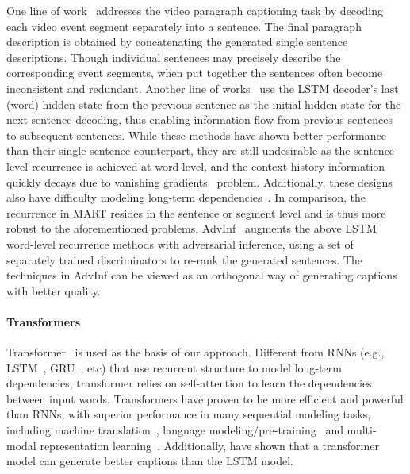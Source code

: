 \documentclass[11pt,a4paper]{article}
\begin{document}
One line of work~\cite{zhou2018end, Zhou2018GroundedVD} addresses the video paragraph captioning task by decoding each video event segment separately into a sentence. 
The final paragraph description is obtained by concatenating the generated single sentence descriptions. Though individual sentences may precisely describe the corresponding event segments, when put together the sentences often become inconsistent and redundant.
Another line of works~\cite{Xiong2018MoveFA, gella2018dataset} use the LSTM decoder's last (word) hidden state from the previous sentence as the initial hidden state for the next sentence decoding, thus enabling information flow from previous sentences to subsequent sentences.
While these methods have shown better performance than their single sentence counterpart, they are still undesirable as the sentence-level recurrence is achieved at word-level, and the context history information quickly decays due to vanishing gradients~\cite{pascanu2013difficulty} problem.
Additionally, these designs also have difficulty modeling long-term dependencies~\cite{hochreiter2001gradient}. 
In comparison, the recurrence in MART resides in the sentence or segment level and is thus more robust to the aforementioned problems. 
AdvInf~\cite{park2019adversarial} augments the above LSTM word-level recurrence methods with adversarial inference, using a set of separately trained discriminators to re-rank the generated sentences. The techniques in AdvInf can be viewed as an orthogonal way of generating captions with better quality.


\paragraph{Transformers}
Transformer~\cite{vaswani2017attention} is used as the basis of our approach. 
Different from RNNs (e.g., LSTM~\cite{hochreiter1997long}, GRU~\cite{chung2014empirical}, etc) that use recurrent structure to model long-term dependencies, transformer relies on self-attention to learn the dependencies between input words. 
Transformers have proven to be more efficient and powerful than RNNs, with superior performance in many sequential modeling tasks, including machine translation~\cite{vaswani2017attention}, language modeling/pre-training~\cite{devlin2018bert, dai2019transformer, yang2019xlnet} and multi-modal representation learning~\cite{tan2019lxmert, chen2019uniter, sun2019videobert}. Additionally, \citet{zhou2018end} have shown that a transformer model can generate better captions than the LSTM model. 
\end{document}
